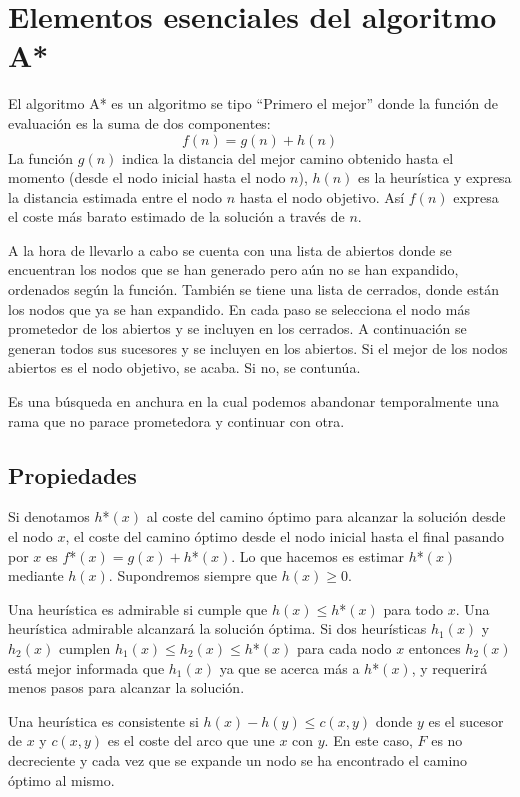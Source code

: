 \documentclass[12pt]{article}
\begin{document}
\section{Elementos esenciales del algoritmo A*}

El algoritmo A* es un algoritmo se tipo ``Primero el mejor'' donde la
función de evaluación es la suma de dos componentes:$$f(n)=g(n)+h(n)$$
La función $g(n)$ indica la distancia del mejor camino obtenido hasta
el momento (desde el nodo inicial hasta el nodo $n$), $h(n)$ es la
heurística y expresa la distancia estimada entre el nodo $n$ hasta el
nodo objetivo. Así $f(n)$ expresa el coste más barato estimado de la
solución a través de $n$.

A la hora de llevarlo a cabo se cuenta con una lista de abiertos donde
se encuentran los nodos que se han generado pero aún no se han
expandido, ordenados según la función. También se tiene una lista de
cerrados, donde están los nodos que ya se han expandido. En cada paso
se selecciona el nodo más prometedor de los abiertos y se incluyen en
los cerrados. A continuación se generan todos sus sucesores y se
incluyen en los abiertos. Si el mejor de los nodos abiertos es el nodo
objetivo, se acaba. Si no, se contunúa.

Es una búsqueda en anchura en la cual podemos abandonar temporalmente
una rama que no parace prometedora y continuar con otra.

\subsection{Propiedades}

Si denotamos $h$*$(x)$ al coste del camino óptimo para alcanzar la
solución desde el nodo $x$, el coste del camino óptimo desde el nodo
inicial hasta el final pasando por $x$ es $f$*$(x)=g(x)+h$*$(x)$. Lo
que hacemos es estimar $h$*$(x)$ mediante $h(x)$. Supondremos siempre
que $h(x)\geq 0$.

Una heurística es admirable si cumple que $h(x) \leq h$*$(x)$ para
todo $x$. Una heurística admirable alcanzará la solución óptima. Si
dos heurísticas $h_1(x)$ y $h_2(x)$ cumplen
$h_1(x) \leq h_2(x) \leq h$*$(x)$ para cada nodo $x$ entonces $h_2(x)$
está mejor informada que $h_1(x)$ ya que se acerca más a $h$*$(x)$, y
requerirá menos pasos para alcanzar la solución.

Una heurística es consistente si $h(x) - h(y) \leq c(x,y)$ donde $y$
es el sucesor de $x$ y $c(x,y)$ es el coste del arco que une $x$ con
$y$. En este caso, $F$ es no decreciente y cada vez que se expande un
nodo se ha encontrado el camino óptimo al mismo.
\end{document}
